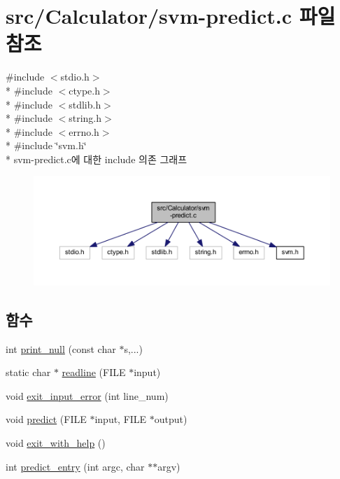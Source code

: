 \hypertarget{svm-predict_8c}{\section{src/\+Calculator/svm-\/predict.c 파일 참조}
\label{svm-predict_8c}
}
{\ttfamily \#include $<$stdio.\+h$>$}\\*
{\ttfamily \#include $<$ctype.\+h$>$}\\*
{\ttfamily \#include $<$stdlib.\+h$>$}\\*
{\ttfamily \#include $<$string.\+h$>$}\\*
{\ttfamily \#include $<$errno.\+h$>$}\\*
{\ttfamily \#include \char`\"{}svm.\+h\char`\"{}}\\*
svm-\/predict.c에 대한 include 의존 그래프
\nopagebreak
\begin{figure}[H]
\begin{center}
\leavevmode
\includegraphics[width=350pt]{svm-predict_8c__incl}
\end{center}
\end{figure}
\subsection*{함수}
\begin{DoxyCompactItemize}
\item 
int \hyperlink{svm-predict_8c_afbcd2ef701a510cd6c24fb0463ec6d7c}{print\+\_\+null} (const char $\ast$s,...)
\item 
static char $\ast$ \hyperlink{svm-predict_8c_aa324656b7bb4eb3ee42699d33c21ef7a}{readline} (F\+I\+L\+E $\ast$input)
\item 
void \hyperlink{svm-predict_8c_ada0be431a4ed2ba4b1a09d4449f2c75b}{exit\+\_\+input\+\_\+error} (int line\+\_\+num)
\item 
void \hyperlink{svm-predict_8c_af94afc3c606a11afa37cbccd25d09f17}{predict} (F\+I\+L\+E $\ast$input, F\+I\+L\+E $\ast$output)
\item 
void \hyperlink{svm-predict_8c_a8bbbfc2cd5ea26b69d3b880c6f509e93}{exit\+\_\+with\+\_\+help} ()
\item 
int \hyperlink{svm-predict_8c_a3e290f6d7d61b2b843a4b8b1382f3958}{predict\+\_\+entry} (int argc, char $\ast$$\ast$argv)
\end{DoxyCompactItemize}
